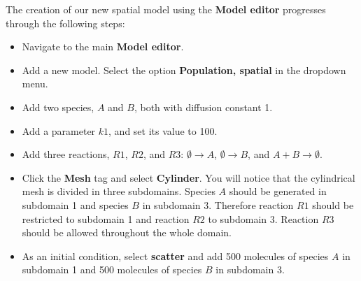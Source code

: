 The creation of our new spatial model using the \textbf{Model editor} progresses through the following steps:
\begin{itemize}
\item Navigate to the main \textbf{Model editor}.
\item Add a new model. Select the option \textbf{Population, spatial} in the dropdown menu.
\item Add two species, $A$ and $B$, both with diffusion constant 1.
\item Add a parameter $k1$, and set its value to 100.
\item Add three reactions, $R1$, $R2$, and $R3$: $\emptyset\to A$, $\emptyset\to B$, and $A+B\to\emptyset$.
 \item Click the \textbf{Mesh} tag and select \textbf{Cylinder}. You will notice that the cylindrical mesh is divided in three subdomains. Species $A$ should be generated in subdomain 1 and species $B$ in subdomain 3. Therefore reaction $R1$ should be restricted to subdomain 1 and reaction $R2$ to subdomain 3. Reaction $R3$ should be allowed throughout the whole domain.
 \item As an initial condition, select \textbf{scatter} and add 500 molecules of species $A$ in subdomain 1 and 500 molecules of species $B$ in subdomain 3. 

\end{itemize}
